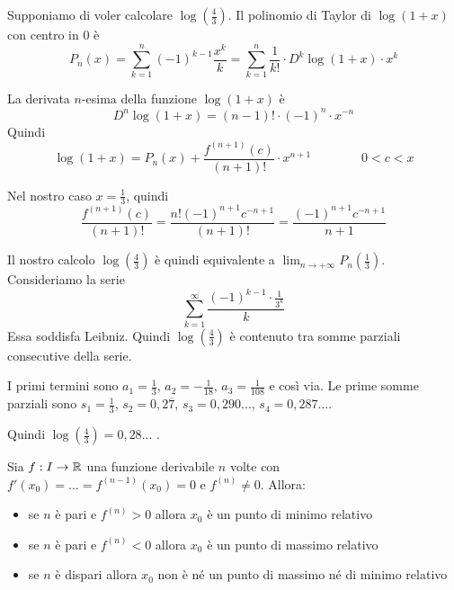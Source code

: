 \begin{example}
Supponiamo di voler calcolare $\log(\frac{4}{3})$. Il polinomio di Taylor di $\log(1+x)$ con centro in 0 è
\begin{equation*}
P_n(x) = \sum_{k=1}^n (-1)^{k-1} \frac{x^k}{k} = \sum_{k=1}^n \frac{1}{k!} \cdot D^k \log(1+x) \cdot x^k
\end{equation*}

La derivata $n$-esima della funzione $\log(1+x)$ è
\begin{equation*}
D^n \log(1+x) = (n-1)! \cdot (-1)^n \cdot x^{-n}
\end{equation*}
Quindi
\begin{equation*}
\log(1+x) = P_n(x) + \frac{f^{(n+1)}(c)}{(n+1)!} \cdot x^{n+1} \qquad \qquad 0 < c < x
\end{equation*}

Nel nostro caso $x = \frac{1}{3}$, quindi
\begin{equation*}
\frac{f^{(n+1)}(c)}{(n+1)!} = \frac{n! (-1)^{n+1} c^{-n+1}}{(n+1)!} = \frac{(-1)^{n+1} c^{-n+1}}{n+1}
\end{equation*}

Il nostro calcolo $\log(\frac{4}{3})$ è quindi equivalente a $\lim_{n \to +\infty} P_n(\frac{1}{3})$. Consideriamo la serie
\begin{equation*}
\sum_{k=1}^\infty \frac{(-1)^{k-1} \cdot \frac{1}{3^k}}{k}
\end{equation*}
Essa soddisfa Leibniz. Quindi $\log(\frac{4}{3})$ è contenuto tra somme parziali consecutive della serie.

I primi termini sono $a_1 = \frac{1}{3}$, $a_2 = -\frac{1}{18}$, $a_3 = \frac{1}{108}$ e così via. Le prime somme parziali sono $s_1 = \frac{1}{3}$, $s_2 = 0,2\overline{7}$, $s_3 = 0,290...$, $s_4 = 0,287...$. 

Quindi $\log(\frac{4}{3}) = 0,28...$ .
\end{example}

\begin{corollary}
Sia $f: I \to \mathbb R$ una funzione derivabile $n$ volte con $f'(x_0) = \ldots = f^{(n-1)} (x_0) = 0$ e $f^{(n)} \neq 0$. Allora:
\begin{itemize}
\item se $n$ è pari e $f^{(n)} > 0$ allora $x_0$ è un punto di minimo relativo
\item se $n$ è pari e $f^{(n)} < 0$ allora $x_0$ è un punto di massimo relativo
\item se $n$ è dispari allora $x_0$ non è né un punto di massimo né di minimo relativo
\end{itemize}
\end{corollary}

